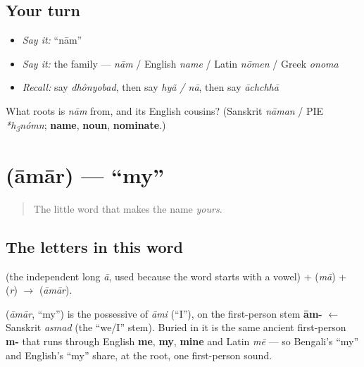 \subsection*{Your turn}
\begin{itemize}
\raggedright
  \item \emph{Say it:} \textquotedblleft{}nām\textquotedblright{}
  \item \emph{Say it:} the family — \emph{nām} / English \emph{name} / Latin \emph{nōmen} / Greek \emph{onoma}
  \item \emph{Recall:} say \emph{dhônyobad}, then say \emph{hyã / nā}, then say \emph{āchchhā}
\end{itemize}

\begin{tcolorbox}[breakable,colback=teal!4,colframe=teal!35!black,title={Before you move on}]
What roots is \emph{nām} from, and its English cousins? (Sanskrit \emph{nāman} / PIE \emph{*h\textsubscript{3}nómn}; \textbf{name}, \textbf{noun}, \textbf{nominate}.)
\end{tcolorbox}
\section[\texorpdfstring{\bn{আমার} (āmār)}{আমার (āmār)}]{ (āmār) — \textquotedblleft{}my\textquotedblright{}}

\label{lesson:BN-C02-amar}



\begin{quote}
The little word that makes the name \emph{yours}.
\end{quote}

\subsection*{The letters in this word}
\textbf{} (the independent long \emph{ā}, used because the word starts with a vowel) + \textbf{} (\emph{mā}) + \textbf{} (\emph{r}) $\to$ \textbf{} (\emph{āmār}).

\begin{cousinweb}
\textbf{} (\emph{āmār}, \textquotedblleft{}my\textquotedblright{}) is the possessive of \emph{āmi} (\textquotedblleft{}I\textquotedblright{}), on the first-person stem \textbf{ām-} $\leftarrow$ Sanskrit \emph{asmad} (the \textquotedblleft{}we/I\textquotedblright{} stem). Buried in it is the same ancient first-person \textbf{m-} that runs through English \textbf{me}, \textbf{my}, \textbf{mine} and Latin \emph{mē} — so Bengali's \textquotedblleft{}my\textquotedblright{} and English's \textquotedblleft{}my\textquotedblright{} share, at the root, one first-person sound.
\end{cousinweb}

